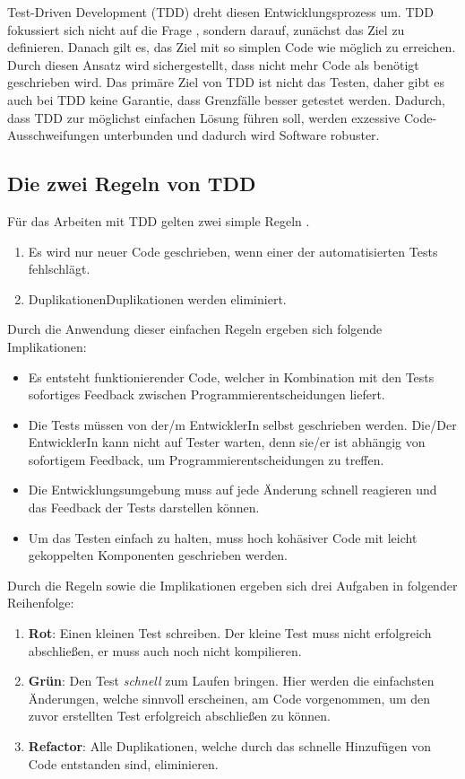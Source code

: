 Test-Driven Development (TDD) dreht diesen Entwicklungsprozess um. TDD fokussiert sich nicht auf die Frage , sondern darauf, zunächst das Ziel zu definieren. Danach gilt es, das Ziel mit so simplen Code wie möglich zu erreichen. Durch diesen Ansatz wird sichergestellt, dass nicht mehr Code als benötigt geschrieben wird. Das primäre Ziel von TDD ist nicht das Testen, daher gibt es auch bei TDD keine Garantie, dass Grenzfälle besser getestet werden. Dadurch, dass TDD zur möglichst einfachen Lösung führen soll, werden exzessive Code-Ausschweifungen unterbunden und dadurch wird Software robuster.

\subsection{Die zwei Regeln von TDD}
Für das Arbeiten mit TDD gelten zwei simple Regeln \autocite[]{Beck:2003}.
\begin{enumerate}
  \item Es wird nur neuer Code geschrieben, wenn einer der automatisierten Tests fehlschlägt.
  \item DuplikationenDuplikationen werden eliminiert.
\end{enumerate}
Durch die Anwendung dieser einfachen Regeln ergeben sich folgende Implikationen:
\begin{itemize}
  \item Es entsteht funktionierender Code, welcher in Kombination mit den Tests sofortiges Feedback zwischen Programmierentscheidungen liefert.
  \item Die Tests müssen von der/m EntwicklerIn selbst geschrieben werden. Die/Der EntwicklerIn kann nicht auf Tester warten, denn sie/er ist abhängig von sofortigem Feedback, um Programmierentscheidungen zu treffen.
  \item Die Entwicklungsumgebung muss auf jede Änderung schnell reagieren und das Feedback der Tests darstellen können.
  \item Um das Testen einfach zu halten, muss hoch kohäsiver Code mit leicht gekoppelten Komponenten geschrieben werden.
\end{itemize}
Durch die Regeln sowie die Implikationen ergeben sich drei Aufgaben in folgender Reihenfolge:
\begin{enumerate}
  \item \textbf{Rot}: Einen kleinen Test schreiben.\newline
  Der kleine Test muss nicht erfolgreich abschließen, er muss auch noch nicht kompilieren.
  \item \textbf{Grün}: Den Test \textit{schnell} zum Laufen bringen.\newline
  Hier werden die einfachsten Änderungen, welche sinnvoll erscheinen, am Code vorgenommen, um den zuvor erstellten Test erfolgreich abschließen zu können.
  \item \textbf{Refactor}: Alle Duplikationen, welche durch das schnelle Hinzufügen von Code entstanden sind, eliminieren.
\end{enumerate}
